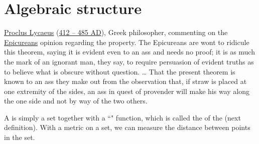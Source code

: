 


\section{Algebraic structure}
\label{sec:d_def}
\qboxns
  {
    \href{http://en.wikipedia.org/wiki/Proclus}{Proclus Lycaeus}
    (\href{http://www-history.mcs.st-andrews.ac.uk/Timelines/TimelineA.html}{412 -- 485 AD}),
    Greek philosopher,
    commenting on the 
    \href{http://en.wikipedia.org/wiki/Epicureans}{Epicureans} 
    opinion regarding the  property.
    \footnotemark
  }
  {
   The Epicureans are wont to ridicule this theorem, 
   saying it is evident even to an ass and needs no proof;
   it is as much the mark of an ignorant man,
   they say, to require persuasion of evident truths as to believe
   what is obscure without question.
   \ldots
   That the present theorem is known to an ass they make out from the
   observation that, if straw is placed at one extremity of the sides,
   an ass in quest of provender will make his way along the one side
   and not by way of the two others.
  }

A  is simply a set together with a ``" function,
which is called the  of the   (next definition).
With a metric on a set, we can measure the distance between points in the
set.

